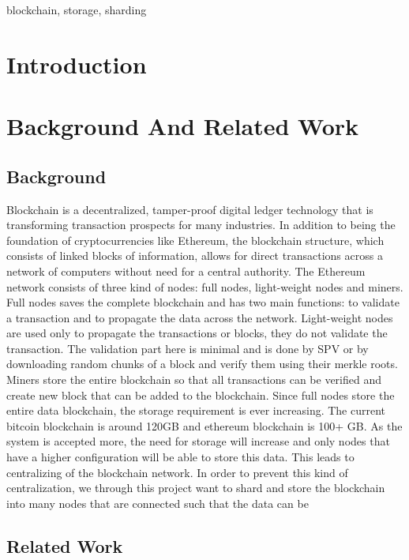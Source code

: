 \documentclass[conference]{IEEEtran}
\begin{document}
\begin{IEEEkeywords}
    blockchain, storage, sharding 
\end{IEEEkeywords}

\section{Introduction}


\section{Background And Related Work}

\subsection{Background}
    Blockchain is a decentralized, tamper-proof digital ledger technology that
    is transforming transaction prospects for many industries. In addition to
    being the foundation of cryptocurrencies like Ethereum, the blockchain
    structure, which consists of linked blocks of information, allows for direct
    transactions across a network of computers without need for a central
    authority. The Ethereum network consists of three kind of nodes: full nodes,
    light-weight nodes and miners. Full nodes saves the complete blockchain and
    has two main functions: to validate a transaction and to propagate the data
    across the network. Light-weight nodes are used only to propagate the
    transactions or blocks, they do not validate the transaction. The validation
    part here is minimal and is done by SPV or by downloading random chunks of
    a block and verify them using their merkle roots. Miners store the entire
    blockchain so that all transactions can be verified and create new block
    that can be added to the blockchain. 
    Since full nodes store the entire data blockchain, the storage requirement
    is ever increasing. The current bitcoin blockchain is around 120GB and
    ethereum blockchain is 100+ GB. As the system is accepted more, the need for
    storage will increase and only nodes that have a higher configuration will
    be able to store this data. This leads to centralizing of the blockchain
    network. In order to prevent this kind of centralization, we through this
    project want to shard and store the blockchain into many nodes that are
    connected such that the data can be 


\subsection{Related Work}
\end{document}
